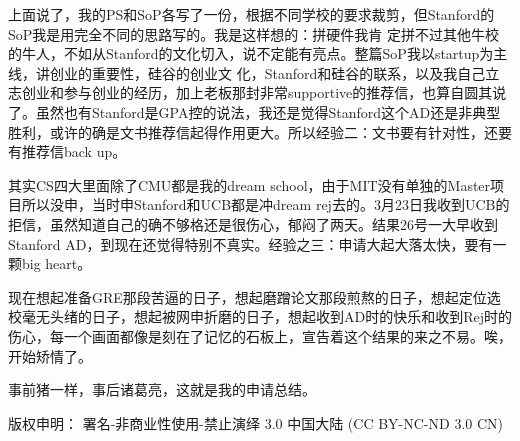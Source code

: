 上面说了，我的PS和SoP各写了一份，根据不同学校的要求裁剪，但Stanford的SoP我是用完全不同的思路写的。我是这样想的：拼硬件我肯 定拼不过其他牛校的牛人，不如从Stanford的文化切入，说不定能有亮点。整篇SoP我以startup为主线，讲创业的重要性，硅谷的创业文 化，Stanford和硅谷的联系，以及我自己立志创业和参与创业的经历，加上老板那封非常supportive的推荐信，也算自圆其说了。虽然也有Stanford是GPA控的说法，我还是觉得Stanford这个AD还是非典型胜利，或许的确是文书推荐信起得作用更大。所以经验二：文书要有针对性，还要有推荐信back up。\par

其实CS四大里面除了CMU都是我的dream school，由于MIT没有单独的Master项目所以没申，当时申Stanford和UCB都是冲dream rej去的。3月23日我收到UCB的拒信，虽然知道自己的确不够格还是很伤心，郁闷了两天。结果26号一大早收到Stanford AD，到现在还觉得特别不真实。经验之三：申请大起大落太快，要有一颗big heart。\par

现在想起准备GRE那段苦逼的日子，想起磨蹭论文那段煎熬的日子，想起定位选校毫无头绪的日子，想起被网申折磨的日子，想起收到AD时的快乐和收到Rej时的伤心，每一个画面都像是刻在了记忆的石板上，宣告着这个结果的来之不易。唉，开始矫情了。\par

事前猪一样，事后诸葛亮，这就是我的申请总结。\par


版权申明： 署名-非商业性使用-禁止演绎 3.0 中国大陆 (CC BY-NC-ND 3.0 CN)